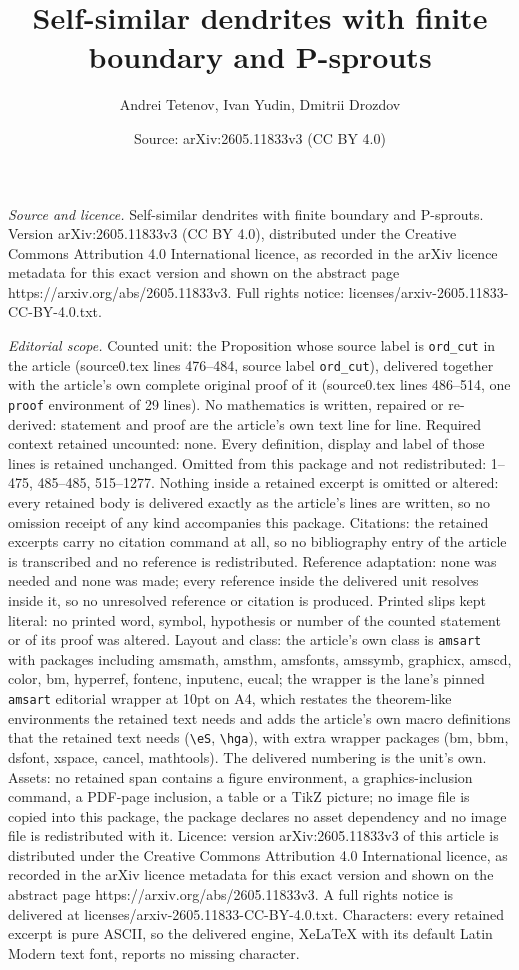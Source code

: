 \documentclass[10pt,a4paper]{amsart}
\title[Self-similar dendrites with finite boundary and P-sprouts]{Self-similar dendrites with finite boundary and P-sprouts}
\author{Andrei Tetenov, Ivan Yudin, Dmitrii Drozdov}
\date{Source: arXiv:2605.11833v3 (CC BY 4.0)}
\begin{document}
\maketitle

\noindent\emph{Source and licence.} Self-similar dendrites with finite boundary and P-sprouts. Version arXiv:2605.11833v3 (CC BY 4.0), distributed under the Creative Commons Attribution 4.0 International licence, as recorded in the arXiv licence metadata for this exact version and shown on the abstract page https://arxiv.org/abs/2605.11833v3. Full rights notice: licenses/arxiv-2605.11833-CC-BY-4.0.txt.\par\smallskip

\noindent\textit{Editorial scope.} Counted unit: the Proposition whose source label is \texttt{ord\_cut} in the article (source0.tex lines 476--484, source label \texttt{ord\_cut}), delivered together with the article's own complete original proof of it (source0.tex lines 486--514, one \texttt{proof} environment of 29 lines). No mathematics is written, repaired or re-derived: statement and proof are the article's own text line for line. Required context retained uncounted: none. Every definition, display and label of those lines is retained unchanged. Omitted from this package and not redistributed: 1--475, 485--485, 515--1277. Nothing inside a retained excerpt is omitted or altered: every retained body is delivered exactly as the article's lines are written, so no omission receipt of any kind accompanies this package. Citations: the retained excerpts carry no citation command at all, so no bibliography entry of the article is transcribed and no reference is redistributed. Reference adaptation: none was needed and none was made; every reference inside the delivered unit resolves inside it, so no unresolved reference or citation is produced. Printed slips kept literal: no printed word, symbol, hypothesis or number of the counted statement or of its proof was altered. Layout and class: the article's own class is \texttt{amsart} with packages including amsmath, amsthm, amsfonts, amssymb, graphicx, amscd, color, bm, hyperref, fontenc, inputenc, eucal; the wrapper is the lane's pinned \texttt{amsart} editorial wrapper at 10pt on A4, which restates the theorem-like environments the retained text needs and adds the article's own macro definitions that the retained text needs (\texttt{\textbackslash eS}, \texttt{\textbackslash hga}), with extra wrapper packages (bm, bbm, dsfont, xspace, cancel, mathtools). The delivered numbering is the unit's own. Assets: no retained span contains a figure environment, a graphics-inclusion command, a PDF-page inclusion, a table or a TikZ picture; no image file is copied into this package, the package declares no asset dependency and no image file is redistributed with it. Licence: version arXiv:2605.11833v3 of this article is distributed under the Creative Commons Attribution 4.0 International licence, as recorded in the arXiv licence metadata for this exact version and shown on the abstract page https://arxiv.org/abs/2605.11833v3. A full rights notice is delivered at licenses/arxiv-2605.11833-CC-BY-4.0.txt. Characters: every retained excerpt is pure ASCII, so the delivered engine, XeLaTeX with its default Latin Modern text font, reports no missing character.
\end{document}
